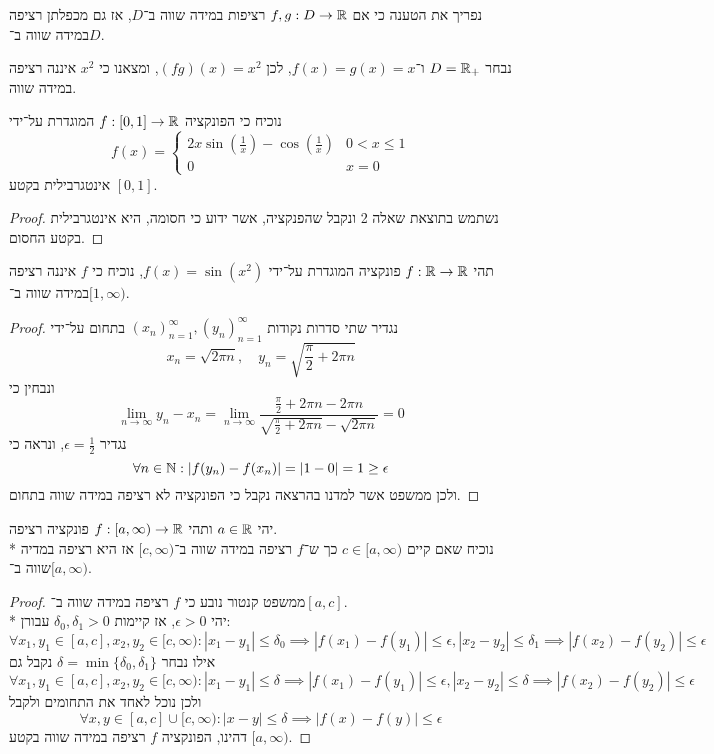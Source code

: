 \Subquestion{}
נפריך את הטענה כי אם $f, g : D \to \mathbb{R}$ רציפות במידה שווה ב־$D$, אז גם מכפלתן רציפה במידה שווה ב־$D$.

נבחר $D = \mathbb{R}_+$ ו־$f(x) = g(x) = x$, לכן $(fg)(x) = x^2$, ומצאנו כי $x^2$ איננה רציפה במידה שווה.

\Subquestion{}
נוכיח כי הפונקציה $f : [0, 1] \to \mathbb{R}$ המוגדרת על־ידי
\[
	f(x) = \begin{cases}
		2x \sin(\frac{1}{x}) - \cos(\frac{1}{x}) & 0 < x \le 1 \\
		0 & x = 0
	\end{cases}
\]
אינטגרבילית בקטע $[0, 1]$.
\begin{proof}
	נשתמש בתוצאת שאלה 2 ונקבל שהפנקציה, אשר ידוע כי חסומה, היא אינטגרבילית בקטע החסום.
\end{proof}

\Question{}
תהי $f : \mathbb{R} \to \mathbb{R}$ פונקציה המוגדרת על־ידי $f(x) = \sin(x^2)$, נוכיח כי $f$ איננה רציפה במידה שווה ב־$[1, \infty)$.
\begin{proof}
	נגדיר שתי סדרות נקודות ${(x_n)}_{n = 1}^\infty, {(y_n)}_{n = 1}^\infty$ בתחום על־ידי
	\[
		x_n = \sqrt{2\pi n},
		\quad
		y_n = \sqrt{\frac{\pi}{2} + 2\pi n}
	\]
	ונבחין כי
	\[
		\lim_{n \to \infty} y_n - x_n
		= \lim_{n \to \infty} \frac{\frac{\pi}{2} + 2\pi n - 2\pi n}{\sqrt{\frac{\pi}{2} + 2\pi n} - \sqrt{2\pi n}}
		= 0
	\]
	נגדיר $\epsilon = \frac{1}{2}$, ונראה כי
	\[
		\forall n \in \mathbb{N} : |f(y_n) - f(x_n)| = |1 - 0| = 1 \ge \epsilon
	\]
	ולכן ממשפט אשר למדנו בהרצאה נקבל כי הפונקציה לא רציפה במידה שווה בתחום.
\end{proof}

\Question{}
\Subquestion{}
יהי $a \in \mathbb{R}$ ותהי $f : [a, \infty) \to \mathbb{R}$ פונקציה רציפה. \\*
נוכיח שאם קיים $c \in [a, \infty)$ כך ש־$f$ רציפה במידה שווה ב־$[c, \infty)$ אז היא רציפה במדיה שווה ב־$[a, \infty)$.
\begin{proof}
	ממשפט קנטור נובע כי $f$ רציפה במידה שווה ב־$[a, c]$. \\*
	יהי $\epsilon > 0$, אז קיימות $\delta_0, \delta_1 > 0$ עבורן:
	\[
		\forall x_1, y_1 \in [a, c], x_2, y_2 \in [c, \infty) : |x_1 - y_1| \le \delta_0 \implies |f(x_1) - f(y_1)| \le \epsilon, |x_2 - y_2| \le \delta_1 \implies |f(x_2) - f(y_2)| \le \epsilon
	\]
	אילו נבחר $\delta = \min\{ \delta_0, \delta_1 \}$ נקבל גם
	\[
		\forall x_1, y_1 \in [a, c], x_2, y_2 \in [c, \infty) : |x_1 - y_1| \le \delta \implies |f(x_1) - f(y_1)| \le \epsilon, |x_2 - y_2| \le \delta \implies |f(x_2) - f(y_2)| \le \epsilon
	\]
	ולכן נוכל לאחד את התחומים ולקבל
	\[
		\forall x, y \in [a, c] \cup [c, \infty) : |x - y| \le \delta \implies |f(x) - f(y)| \le \epsilon
	\]
	דהינו, הפונקציה $f$ רציפה במידה שווה בקטע $[a, \infty)$.
\end{proof}


